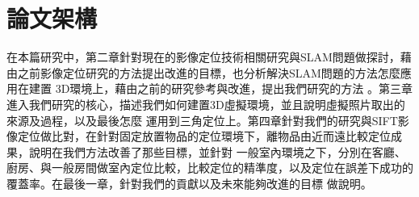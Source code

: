 \section{論文架構}

	在本篇研究中，第二章針對現在的影像定位技術相關研究與SLAM問題做探討，藉由之前影像定位研究的方法提出改進的目標，也分析解決SLAM問題的方法怎麼應用在建置
3D環境上，藉由之前的研究參考與改進，提出我們研究的方法	。第三章進入我們研究的核心，描述我們如何建置3D虛擬環境，並且說明虛擬照片取出的來源及過程，以及最後怎麼
運用到三角定位上。第四章針對我們的研究與SIFT影像定位做比對，在針對固定放置物品的定位環境下，離物品由近而遠比較定位成果，說明在我們方法改善了那些目標，並針對
一般室內環境之下，分別在客廳、廚房、與一般房間做室內定位比較，比較定位的精準度，以及定位在誤差下成功的覆蓋率。在最後一章，針對我們的貢獻以及未來能夠改進的目標
做說明。


